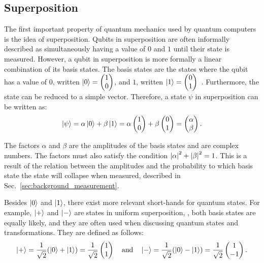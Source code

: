 \subsection{Superposition}
\label{sec:background_superposition}
The first important property of quantum mechanics used by quantum computers is the idea of superposition. Qubits in superposition are often informally described as simultaneously having a value of $0$ and $1$ until their state is measured. However, a qubit in superposition is more formally a linear combination of its basis states. The basis states are the states where the qubit has a value of $0$, written $\ket{0} = \begin{pmatrix} 1 \\ 0 \end{pmatrix}$, and $1$, written $\ket{1} = \begin{pmatrix} 0 \\ 1 \end{pmatrix}$~\cite{DiCh20a}.
Furthermore, the state can be reduced to a simple vector. Therefore, a state $\psi$ in superposition can be written as:
\begin{equation*}
    \ket{\psi} = \alpha \ket{0} + \beta \ket{1} = \alpha \begin{pmatrix} 1 \\ 0 \end{pmatrix} + \beta \begin{pmatrix} 0 \\ 1 \end{pmatrix} = \begin{pmatrix} \alpha \\ \beta \end{pmatrix}.
\end{equation*}

The factors $\alpha$ and $\beta$ are the amplitudes of the basis states and are complex numbers. The factors must also satisfy the condition $\abs{\alpha}^2 + \abs{\beta}^2 = 1$. This is a result of the relation between the amplitudes and the probability to which basis state the state will collapse when measured, described in Sec.~\ref{sec:background_measurement}.

Besides $\ket{0}$ and $\ket{1}$, there exist more relevant short-hands for quantum states. For example, $\ket{+}$ and $\ket{-}$ are states in uniform superposition, \ie, both basis states are equally likely, and they are often used when discussing quantum states and transformations. They are defined as follows:
\begin{equation*}
    \ket{+} = \frac{1}{\sqrt{2}} (\ket{0} + \ket{1}) = \frac{1}{\sqrt{2}} \begin{pmatrix} 1 \\ 1 \end{pmatrix}
    \quad  \text{and}  \quad
     \ket{-} = \frac{1}{\sqrt{2}} (\ket{0} - \ket{1})  = \frac{1}{\sqrt{2}} \begin{pmatrix} 1 \\ -1 \end{pmatrix}.
\end{equation*}

